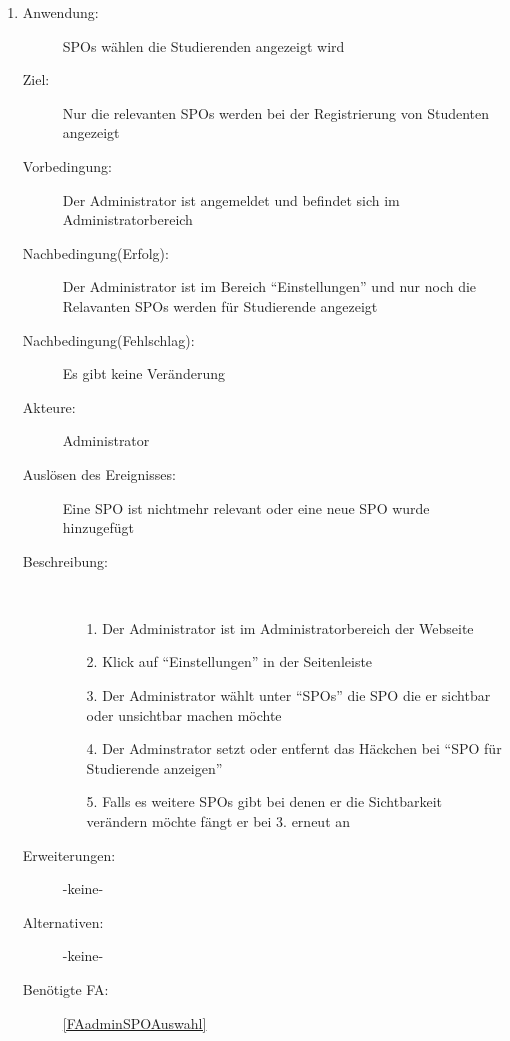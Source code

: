 \documentclass[parskip=full]{scrartcl}
\newcommand{\swtLabel}[1]{\textbf{/#1\arabic*0/}}
\begin{document}
\begin{enumerate} [label=\swtLabel{A}]
  \item \label{UCadminSPOwelcheWerdeAngezeigt}
    \begin{description}
    \item[Anwendung:] SPOs wählen die Studierenden angezeigt wird
    \item[Ziel:] Nur die relevanten SPOs werden bei der Registrierung von
    Studenten angezeigt
    \item[Vorbedingung:] Der Administrator ist angemeldet und befindet sich im Administratorbereich
    \item[Nachbedingung(Erfolg):] Der Administrator ist im Bereich
    \enquote{Einstellungen} und nur noch die Relavanten SPOs werden für
        Studierende angezeigt
    \item[Nachbedingung(Fehlschlag):] Es gibt keine Veränderung
    \item[Akteure:] Administrator
    \item[Auslösen des Ereignisses:] Eine SPO ist nichtmehr relevant oder eine
    neue SPO wurde hinzugefügt
    \item[Beschreibung:]~
    \begin{enumerate}
      \item[1.] Der Administrator ist im Administratorbereich der Webseite
      \item[2.] Klick auf \enquote{Einstellungen} in der Seitenleiste
      \item[3.] Der Administrator wählt unter \enquote{SPOs} die SPO die er
      sichtbar oder unsichtbar machen möchte
      \item[4.] Der Adminstrator setzt oder entfernt das Häckchen bei
      \enquote{SPO für Studierende anzeigen} %
      \item[5.] Falls es weitere SPOs gibt bei denen er die Sichtbarkeit
      verändern möchte fängt er bei 3. erneut an  
    \end{enumerate}
    \item[Erweiterungen:] -keine-
    \item[Alternativen:] -keine-
    \item[Benötigte FA:] \ref{FAadminSPOAuswahl}
  \end{description}
  

\end{enumerate}
\end{document}
